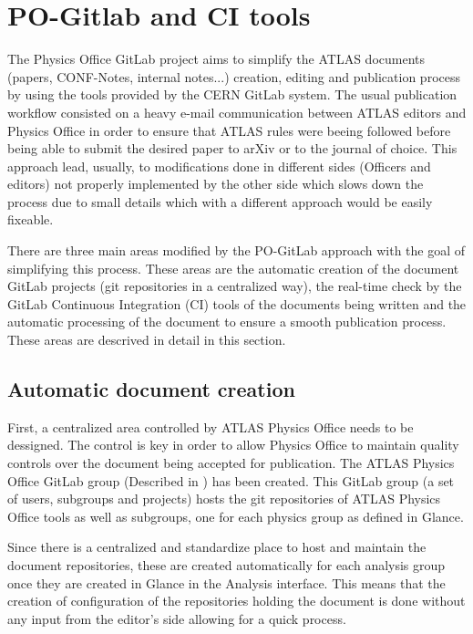 \section{PO-Gitlab and CI tools}
\label{sec:po-ci-tools}

The Physics Office GitLab project aims to simplify the ATLAS documents (papers, CONF-Notes, internal notes...) creation, editing and publication process by using the tools provided by the CERN GitLab system. The usual publication workflow consisted on a heavy e-mail communication between ATLAS editors and Physics Office in order to ensure that ATLAS rules were beeing followed before being able to submit the desired paper to arXiv or to the journal of choice. This approach lead, usually, to modifications done in different sides (Officers and editors) not properly implemented by the other side which slows down the process due to small details which with a different approach would be easily fixeable.

There are three main areas modified by the PO-GitLab approach with the goal of simplifying this process. These areas are the automatic creation of the document GitLab projects (git repositories in a centralized way), the real-time check by the GitLab Continuous Integration (CI) tools of the documents being written and the automatic processing of the document to ensure a smooth publication process. These areas are descrived in detail in this section.

\subsection{Automatic document creation}
First, a centralized area controlled by ATLAS Physics Office needs to be dessigned. The control is key in order to allow Physics Office to maintain quality controls over the document being accepted for publication. The ATLAS Physics Office GitLab group (Described in \Sect{\ref{sec:pogitlab-group}}) has been created. This GitLab group (a set of users, subgroups and projects) hosts the git repositories of ATLAS Physics Office tools as well as subgroups, one for each physics group as defined in Glance.

Since there is a centralized and standardize place to host and maintain the document repositories, these are created automatically for each analysis group once they are created in Glance in the Analysis interface. This means that the creation of configuration of the repositories holding the document is done without any input from the editor's side allowing for a quick process.

